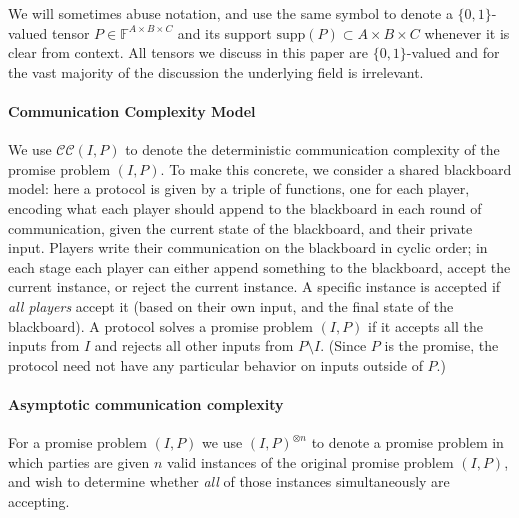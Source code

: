 \documentclass[10pt,a4paper]{article}
\newcommand{\F}{\mathbb{F}}
\newcommand{\cc}{\mathcal{CC}}
\newcommand{\supp}{\mathrm{supp}}
\begin{document}
We will sometimes abuse notation, and use the same symbol to denote a $\{0, 1\}$-valued tensor $P \in \F^{A \times B \times C}$ and its support $\supp(P) \subset A \times B \times C$ whenever it is clear from context. All tensors we discuss in this paper are $\{0,1\}$-valued and for the vast majority of the discussion the underlying field is irrelevant.

\paragraph{Communication Complexity Model}
We use $\cc(I, P)$ to denote the deterministic communication complexity of the promise problem $(I, P)$. To make this concrete, we consider a shared blackboard model: here a protocol is given by a triple of functions, one for each player, encoding what each player should append to the blackboard in each round of communication, given the current state of the blackboard, and their private input. Players write their communication on the blackboard in cyclic order; in each stage each player can either append something to the blackboard, accept the current instance, or reject the current instance. A specific instance is accepted if \emph{all players} accept it (based on their own input, and the final state of the blackboard). A protocol solves a promise problem $(I, P)$ if it accepts all the inputs from $I$ and rejects all other inputs from $P \setminus I$. (Since $P$ is the promise, the protocol need not have any particular behavior on inputs outside of $P$.)

\paragraph{Asymptotic communication complexity}
For a promise problem $(I,P)$ we use $(I, P)^{\otimes n}$ to denote a promise problem in which parties are given $n$ valid instances of the original promise problem $(I, P)$, and wish to determine whether \emph{all} of those instances simultaneously are accepting.
\end{document}
